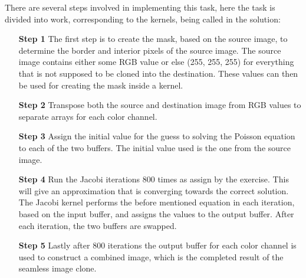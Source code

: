 There are several steps involved in implementing this task, here the task is divided into work, corresponding to the kernels, being called in the solution:
\begin{enumerate}
	\item[\textbf{Step 1}]
	The first step is to create the mask, based on the source image, to determine the border and interior pixels of the source image. The source image contains either some RGB value or else (255, 255, 255) for everything that is not supposed to be cloned into the destination. These values can then be used for creating the mask inside a kernel.
	\item[\textbf{Step 2}]
	Transpose both the source and destination image from RGB values to separate arrays for each color channel.
	\item[\textbf{Step 3}]
	Assign the initial value for the guess to solving the Poisson equation to each of the two buffers. The initial value used is the one from the source image.
	\item[\textbf{Step 4}]
	Run the Jacobi iterations 800 times as assign by the exercise. This will give an approximation that is converging towards the correct solution. The Jacobi kernel performs the before mentioned equation in each iteration, based on the input buffer, and assigns the values to the output buffer. After each iteration, the two buffers are swapped.
	\item[\textbf{Step 5}]
	Lastly after 800 iterations the output buffer for each color channel is used to construct a combined image, which is the completed result of the seamless image clone.


\end{enumerate}